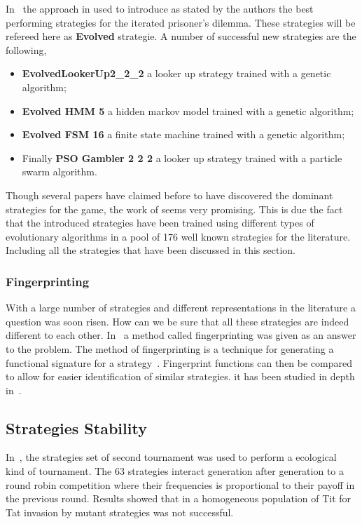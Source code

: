 \documentclass{article}
\begin{document}
In~\cite{Knight2017} the approach in used to introduce as stated
by the authors the best performing strategies for the iterated prisoner’s dilemma.
These strategies will be refereed here as \textbf{Evolved} strategie.
A number of successful new strategies are the following,

\begin{itemize}
    \item \textbf{EvolvedLookerUp2\_2\_2} a looker up strategy trained with a
    genetic algorithm;
    \item \textbf{Evolved HMM 5} a hidden markov model trained with a genetic 
    algorithm;
    \item \textbf{Evolved FSM 16} a finite state machine trained with a genetic
    algorithm;
    \item Finally \textbf{PSO Gambler 2 2 2} a looker up strategy trained with
    a particle swarm algorithm.
\end{itemize}

Though several papers have claimed before to have discovered the dominant
strategies for the game, the work of \cite{Knight2017} seems very promising. 
This is due the fact that the introduced strategies have been trained using
different types of evolutionary algorithms in a pool of 176 well known 
strategies for the literature. Including all the strategies that have been 
discussed in this section.

\subsubsection{Fingerprinting}

With a large number of strategies and different representations in the literature
a question was soon risen. How can we be sure that all these strategies are 
indeed different to each other. In~\cite{Ashlock2005} a method called fingerprinting was given
as an answer to the problem. The method of fingerprinting is a technique for 
generating a functional signature for a strategy~\cite{Ashlock2008}. Fingerprint functions
can then be compared to allow for easier identification of similar strategies.
it has been studied in depth in~\cite{Ashlock2008, Ashlock2009, Ashlock2010, Ashlock2006a}.

\subsection{Strategies Stability}

In~\cite{Axelrod1981}, the strategies set of second tournament was used
to perform a ecological kind of tournament. The 63 strategies interact generation
after generation to a round robin competition where their frequencies is proportional
to their payoff in the previous round. Results showed that in a homogeneous
population of Tit for Tat invasion by mutant strategies was not successful.
\end{document}

